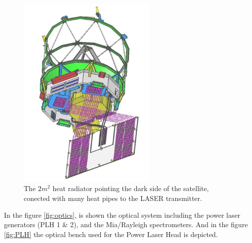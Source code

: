 \begin{figure}[h]
	\centering
	\includegraphics[width=0.6\textwidth]{img/radiator.png}
	\caption[ALADIN thermal control]{The $2m^2$ heat radiator pointing the
	dark side of the satellite, conected with many heat pipes to the LASER
	transmitter. \cite{Endemann2004}}
	\label{fig:full_payload}
\end{figure}

In the figure \ref{fig:optics}, is shown the optical system including the power
laser generators (PLH 1 \& 2), and the Mia/Rayleigh spectrometers. And in the figure
\ref{fig:PLH} the optical bench used for the Power Laser Head is depicted.\\

